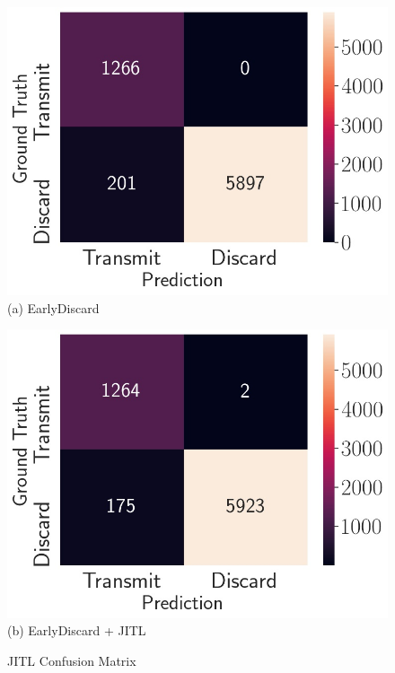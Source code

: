 \begin{figure}
\centering
\begin{minipage}[b]{.45\linewidth}
\centering
\includegraphics[width=\linewidth]{FIGS/jitl-earlydiscard-cm}\\
{(a) EarlyDiscard}
\end{minipage}
\begin{minipage}[b]{.45\linewidth}
\centering
\includegraphics[width=\linewidth]{FIGS/jitl-combined-cm}\\
{(b) EarlyDiscard + JITL}
\end{minipage}
\caption{JITL Confusion Matrix}
\label{fig:wca-jitl}
\end{figure}

